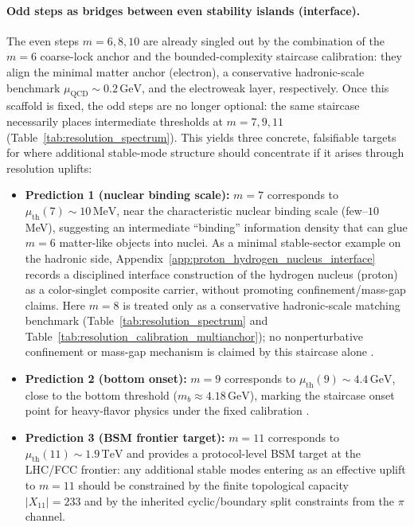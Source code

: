 \paragraph{Odd steps as bridges between even stability islands (interface).}
The even steps $m=6,8,10$ are already singled out by the combination of the $m=6$ coarse-lock anchor and the bounded-complexity staircase calibration: they align the minimal matter anchor (electron), a conservative hadronic-scale \MatchTag benchmark $\mu_{\mathrm{QCD}}\sim 0.2\,\mathrm{GeV}$, and the electroweak layer, respectively.
Once this scaffold is fixed, the odd steps are no longer optional: the same staircase necessarily places intermediate thresholds at $m=7,9,11$ (Table~\ref{tab:resolution_spectrum}).
This yields three concrete, falsifiable targets for where additional stable-mode structure should concentrate if it arises through resolution uplifts:
\begin{itemize}
\item \textbf{Prediction 1 (nuclear binding scale):} $m=7$ corresponds to $\mu_{\mathrm{th}}(7)\sim 10\,\mathrm{MeV}$, near the characteristic nuclear binding scale (few--$10$ MeV), suggesting an intermediate ``binding'' information density that can glue $m=6$ matter-like objects into nuclei.
As a minimal stable-sector example on the hadronic side, Appendix~\ref{app:proton_hydrogen_nucleus_interface} records a disciplined interface construction of the hydrogen nucleus (proton) as a color-singlet composite carrier, without promoting confinement/mass-gap claims.
Here $m=8$ is treated only as a conservative hadronic-scale matching benchmark (Table~\ref{tab:resolution_spectrum} and Table~\ref{tab:resolution_calibration_multianchor}); no nonperturbative confinement or mass-gap mechanism is claimed by this staircase alone \cite{JaffeWitten2000YangMillsMassGap,Greensite2011Confinement}.
\item \textbf{Prediction 2 (bottom onset):} $m=9$ corresponds to $\mu_{\mathrm{th}}(9)\sim 4.4\,\mathrm{GeV}$, close to the bottom threshold ($m_b\approx 4.18\,\mathrm{GeV}$), marking the staircase onset point for heavy-flavor physics under the fixed calibration \cite{PDGRPP2024}.
\item \textbf{Prediction 3 (BSM frontier target):} $m=11$ corresponds to $\mu_{\mathrm{th}}(11)\sim 1.9\,\mathrm{TeV}$ and provides a protocol-level BSM target at the LHC/FCC frontier: any additional stable modes entering as an effective uplift to $m=11$ should be constrained by the finite topological capacity $|X_{11}|=233$ and by the inherited cyclic/boundary split constraints from the $\pi$ channel.
\end{itemize}

